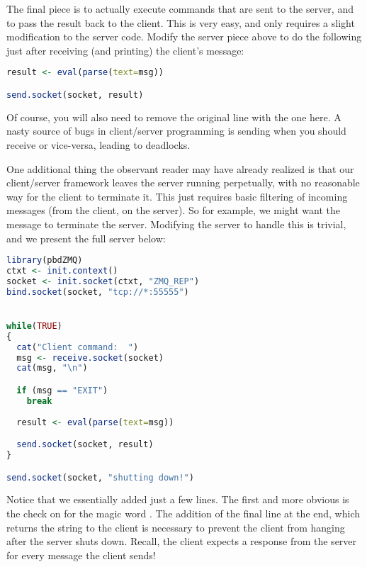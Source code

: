 The final piece is to actually execute commands that are sent to the server,
and to pass the result back to the client.  This is very easy, and only 
requires a slight modification to the server code.  Modify the server piece
above to do the following just after receiving (and printing) the client's
message:

\begin{lstlisting}[language=R,title=Server Modification]
result <- eval(parse(text=msg))

send.socket(socket, result)
\end{lstlisting}

Of course, you will also need to remove the original  line
with the one here.  A nasty source of bugs in client/server programming is
sending when you should receive or vice-versa, leading to deadlocks.

One additional thing the observant reader may have already realized is that our
client/server framework leaves the server running perpetually, with no
reasonable way for the client to terminate it.  This just requires basic
filtering of incoming messages (from the client, on the server).  So for
example, we might want the message  to terminate the server.
Modifying the server to handle this is trivial, and we present the full server
below:

\begin{lstlisting}[language=R,title=Full Server]
library(pbdZMQ)
ctxt <- init.context()
socket <- init.socket(ctxt, "ZMQ_REP")
bind.socket(socket, "tcp://*:55555")


while(TRUE)
{
  cat("Client command:  ")
  msg <- receive.socket(socket)
  cat(msg, "\n")

  if (msg == "EXIT")
    break
  
  result <- eval(parse(text=msg))

  send.socket(socket, result)
}

send.socket(socket, "shutting down!")
\end{lstlisting}

Notice that we essentially added just a few lines.  The first and more obvious
is the check on  for the magic word .  The addition
of the final  line at the end, which returns the string
 to the client is necessary to prevent the client from
hanging after the server shuts down.  Recall, the client expects a response
from the server for every message the client sends!



